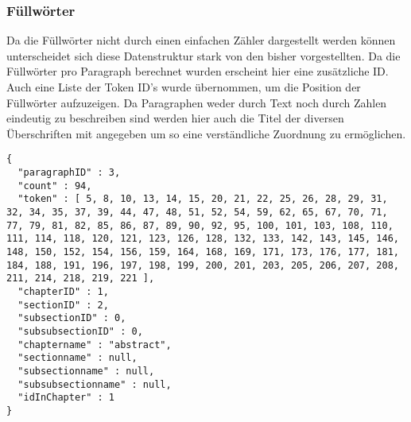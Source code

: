 \subsubsection*{Füllwörter}
Da die Füllwörter nicht durch einen einfachen Zähler dargestellt werden können unterscheidet sich diese Datenstruktur stark von den bisher vorgestellten. Da die Füllwörter pro Paragraph berechnet wurden erscheint hier eine zusätzliche ID. Auch eine Liste der Token ID's wurde übernommen, um die Position der Füllwörter aufzuzeigen. Da Paragraphen weder durch Text noch durch Zahlen eindeutig zu beschreiben sind werden hier auch die Titel der diversen Überschriften mit angegeben um so eine verständliche Zuordnung zu ermöglichen. 
\newpage
\begin{lstlisting}
{
  "paragraphID" : 3,
  "count" : 94,
  "token" : [ 5, 8, 10, 13, 14, 15, 20, 21, 22, 25, 26, 28, 29, 31, 32, 34, 35, 37, 39, 44, 47, 48, 51, 52, 54, 59, 62, 65, 67, 70, 71, 77, 79, 81, 82, 85, 86, 87, 89, 90, 92, 95, 100, 101, 103, 108, 110, 111, 114, 118, 120, 121, 123, 126, 128, 132, 133, 142, 143, 145, 146, 148, 150, 152, 154, 156, 159, 164, 168, 169, 171, 173, 176, 177, 181, 184, 188, 191, 196, 197, 198, 199, 200, 201, 203, 205, 206, 207, 208, 211, 214, 218, 219, 221 ],
  "chapterID" : 1,
  "sectionID" : 2,
  "subsectionID" : 0,
  "subsubsectionID" : 0,
  "chaptername" : "abstract",
  "sectionname" : null,
  "subsectionname" : null,
  "subsubsectionname" : null,
  "idInChapter" : 1
}
\end{lstlisting}